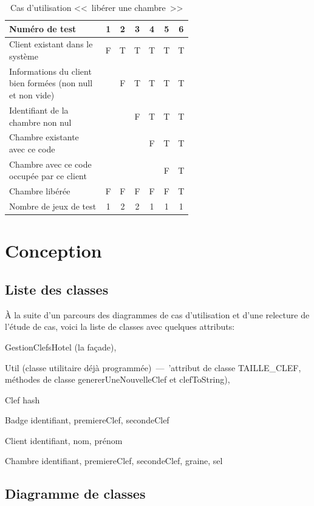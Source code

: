 \documentclass[11pt,article]{article}
\newcommand{\nullvalue}{\textsf{null}\xspace}
\begin{document}
\begin{table}[htbp!]
\begin{tabular}{|p{0.6\linewidth}|c|c|c|c|c|c|}
\hline
Numéro de test
&1&2&3&4&5&6\\
\hline
\hline
Client existant dans le système
&F&T&T&T&T&T\\
\hline
Informations du client bien formées (non \nullvalue et non vide)
& &F&T&T&T&T\\
\hline
Identifiant de la chambre non nul
& & &F&T&T&T\\
\hline
Chambre existante avec ce code
& & & &F&T&T\\
\hline
Chambre avec ce code occupée par ce client
& & & & &F&T\\
\hline
\hline
Chambre libérée
&F&F&F&F&F&T\\
\hline
\hline
Nombre de jeux de test
&1&2&2&1&1&1\\
\hline
\end{tabular}
\caption{Cas d'utilisation <<~libérer une chambre~>>}
\end{table}
\newpage

\section{Conception}

\subsection{Liste des classes}

À la suite d'un parcours des diagrammes de cas d'utilisation et d'une
relecture de l'étude de cas, voici la liste de classes avec quelques
attributs:
\begin{compactitem}
\item \textsf{GestionClefsHotel} (la façade),
\item \textsf{Util} (classe utilitaire déjà programmée)~---~'attribut
  de classe \textsf{TAILLE\_CLEF}, méthodes de classe
  \textsf{genererUneNouvelleClef} et \textsf{clefToString}),
\item \textsf{Clef} hash
\item \textsf{Badge} identifiant, premiereClef, secondeClef
\item \textsf{Client} identifiant, nom, prénom
\item \textsf{Chambre} identifiant, premiereClef, secondeClef, graine, sel
\end{compactitem}
\newpage

\subsection{Diagramme de classes}
\end{document}
